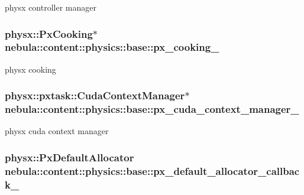 physx controller manager \hypertarget{classnebula_1_1content_1_1physics_1_1base_a13ae9c72e0c5138ab97fb2f91f574d51}{
\subsubsection[{px\_\-cooking\_\-}]{\setlength{\rightskip}{0pt plus 5cm}physx::PxCooking$\ast$ {\bf nebula::content::physics::base::px\_\-cooking\_\-}}}
\label{classnebula_1_1content_1_1physics_1_1base_a13ae9c72e0c5138ab97fb2f91f574d51}


physx cooking \hypertarget{classnebula_1_1content_1_1physics_1_1base_a8013955852d69be077b892e62e65e609}{
\subsubsection[{px\_\-cuda\_\-context\_\-manager\_\-}]{\setlength{\rightskip}{0pt plus 5cm}physx::pxtask::CudaContextManager$\ast$ {\bf nebula::content::physics::base::px\_\-cuda\_\-context\_\-manager\_\-}}}
\label{classnebula_1_1content_1_1physics_1_1base_a8013955852d69be077b892e62e65e609}


physx cuda context manager \hypertarget{classnebula_1_1content_1_1physics_1_1base_af48d16416f3fe40622294c185e187c59}{
\subsubsection[{px\_\-default\_\-allocator\_\-callback\_\-}]{\setlength{\rightskip}{0pt plus 5cm}physx::PxDefaultAllocator {\bf nebula::content::physics::base::px\_\-default\_\-allocator\_\-callback\_\-}}}
\label{classnebula_1_1content_1_1physics_1_1base_af48d16416f3fe40622294c185e187c59}


